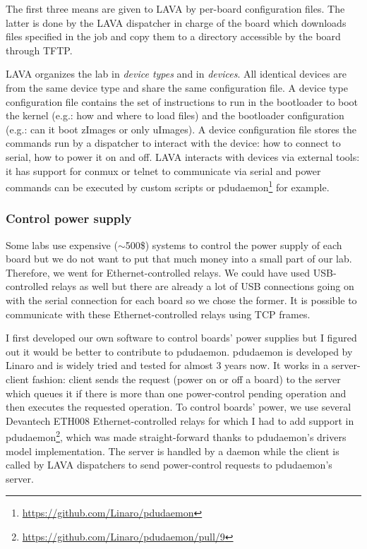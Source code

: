 The first three means are given to LAVA by per-board configuration files. The latter is done by the LAVA dispatcher in charge of the board which downloads files specified in the job and copy them to a directory accessible by the board through TFTP.

LAVA organizes the lab in \textit{device types} and in \textit{devices}. All identical devices are from the same device type and share the same configuration file. A device type configuration file contains the set of instructions to run in the bootloader to boot the kernel (e.g.: how and where to load files) and the bootloader configuration (e.g.: can it boot zImages or only uImages). A device configuration file stores the commands run by a dispatcher to interact with the device: how to connect to serial, how to power it on and off. LAVA interacts with devices via external tools: it has support for conmux or telnet to communicate via serial and power commands can be executed by custom scripts or pdudaemon\footnote{\url{https://github.com/Linaro/pdudaemon}} for example.

\subsubsection{Control power supply}

Some labs use expensive ($\sim$500\$) systems to control the power supply of each board but we do not want to put that much money into a small part of our lab. Therefore, we went for Ethernet-controlled relays. We could have used USB-controlled relays as well but there are already a lot of USB connections going on with the serial connection for each board so we chose the former. It is possible to communicate with these Ethernet-controlled relays using TCP frames.

I first developed our own software to control boards' power supplies but I figured out it would be better to contribute to pdudaemon. pdudaemon is developed by Linaro and is widely tried and tested for almost 3 years now. It works in a server-client fashion: client sends the request (power on or off a board) to the server which queues it if there is more than one power-control pending operation and then executes the requested operation. To control boards' power, we use several Devantech ETH008 Ethernet-controlled relays for which I had to add support in pdudaemon\footnote{\url{https://github.com/Linaro/pdudaemon/pull/9}}, which was made straight-forward thanks to pdudaemon's drivers model implementation. The server is handled by a daemon while the client is called by LAVA dispatchers to send power-control requests to pdudaemon's server.

